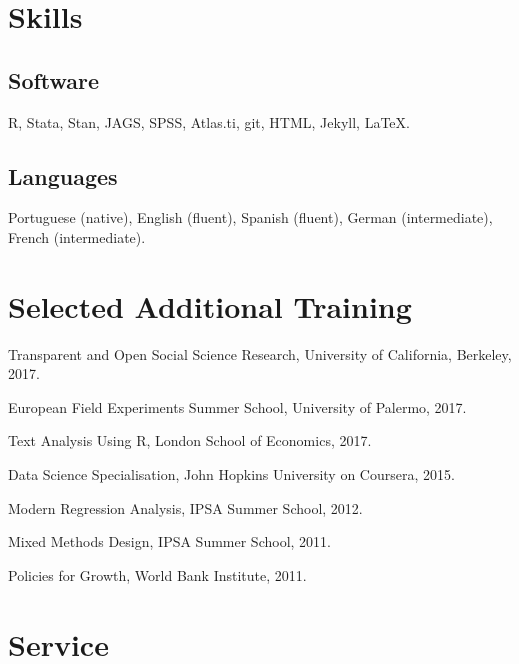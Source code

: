 \documentclass[a4paper]{article}
\renewenvironment{itemize}{
	\begin{list}{}{
			\setlength{\leftmargin}{1.5em}
		}
		}{
	\end{list}
}
\begin{document}
	\section*{Skills}

	\subsection*{Software}

	\begin{itemize}
		\item R, Stata, Stan, JAGS, SPSS, Atlas.ti, git, HTML, Jekyll, \LaTeX{}.
	\end{itemize}

	\subsection*{Languages}

	\begin{itemize}
		\item Portuguese (native), English (fluent), Spanish (fluent), German (intermediate), French (intermediate).
	\end{itemize}

	\section*{Selected Additional Training}

	\begin{itemize}
		\item Transparent and Open Social Science Research, University of California, Berkeley, 2017. %
		\item European Field Experiments Summer School, University of Palermo, 2017.
		\item Text Analysis Using R, London School of Economics, 2017.
		\item Data Science Specialisation, John Hopkins University on Coursera, 2015.
		\item Modern Regression Analysis, IPSA Summer School, 2012.
		\item Mixed Methods Design, IPSA Summer School, 2011.
		\item Policies for Growth, World Bank Institute, 2011.
	\end{itemize}

	\section*{Service}
\end{document}
